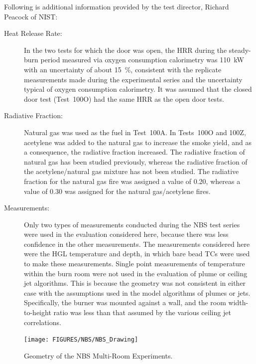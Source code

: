 Following is additional information provided by the test director, Richard Peacock of NIST:
\begin{description}
\item[Heat Release Rate:] In the two tests for which
the door was open, the HRR during the steady-burn period measured via oxygen consumption
calorimetry was 110~kW with an uncertainty of about 15~\%, consistent with the replicate
measurements made during the experimental series and the uncertainty typical of oxygen
consumption calorimetry. It was assumed that the closed door test (Test~100O) had the same HRR as the open
door tests.
\item[Radiative Fraction:] Natural gas was used as the fuel in
Test~100A. In Tests~100O and 100Z, acetylene was added to the natural gas to increase the
smoke yield, and as a consequence, the radiative fraction increased. The radiative fraction of
natural gas has been studied previously, whereas the radiative fraction of the acetylene/natural
gas mixture has not been studied. The radiative fraction for the natural gas fire was assigned a
value of 0.20, whereas a value of 0.30 was assigned for the natural gas/acetylene fires.
\item[Measurements:] Only two types of measurements conducted during the NBS test series were used in the
evaluation considered here, because there was less confidence in the other measurements.
The measurements considered here were the HGL temperature and depth, in which bare bead
TCs were used to make these measurements. Single point measurements of temperature within
the burn room were not used in the evaluation of plume or ceiling jet algorithms. This is because
the geometry was not consistent in either case with the assumptions used in the model algorithms
of plumes or jets. Specifically, the burner was mounted against a wall, and the room width-to-height
ratio was less than that assumed by the various ceiling jet correlations.
\end{description}


\begin{figure}
\begin{center}
\texttt{[image: FIGURES/NBS/NBS\_Drawing]}
\end{center}
\caption{Geometry of the NBS Multi-Room Experiments.}
\label{NBS_Drawing}
\end{figure}





\clearpage

